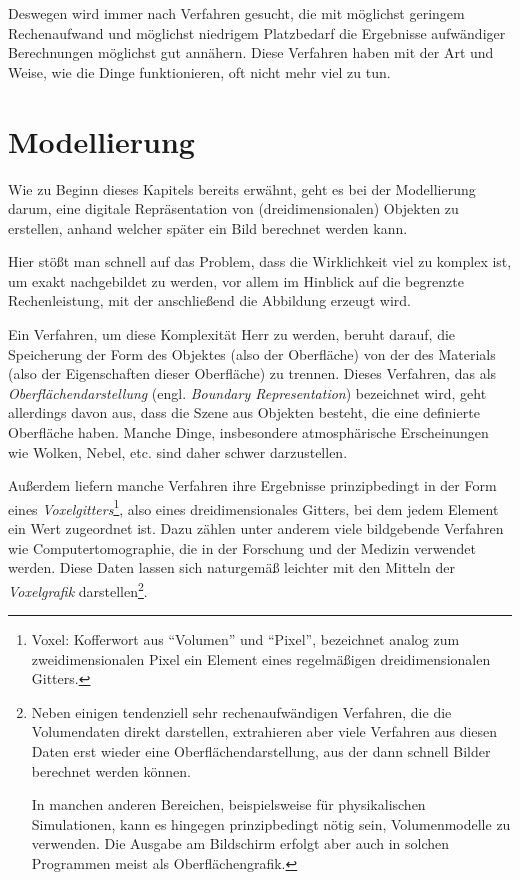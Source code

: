 Deswegen wird immer nach Verfahren gesucht, die mit möglichst geringem Rechenaufwand und möglichst niedrigem Platzbedarf die Ergebnisse aufwändiger Berechnungen möglichst gut annähern. Diese Verfahren haben mit der Art und Weise, wie die Dinge funktionieren, oft nicht mehr viel zu tun.

\section{Modellierung}
Wie zu Beginn dieses Kapitels bereits erwähnt, geht es bei der Modellierung darum, eine digitale Repräsentation von (dreidimensionalen) Objekten zu erstellen, anhand welcher später ein Bild berechnet werden kann.

Hier stößt man schnell auf das Problem, dass die Wirklichkeit viel zu komplex ist, um exakt nachgebildet zu werden, vor allem im Hinblick auf die begrenzte Rechenleistung, mit der anschließend die Abbildung erzeugt wird.

Ein Verfahren, um diese Komplexität Herr zu werden, beruht darauf, die Speicherung der Form des Objektes (also der Oberfläche) von der des Materials (also der Eigenschaften dieser Oberfläche) zu trennen. Dieses Verfahren, das als \emph{Oberflächendarstellung} (engl. \emph{Boundary Representation}) bezeichnet wird, geht allerdings davon aus, dass die Szene aus Objekten besteht, die eine definierte Oberfläche haben. Manche Dinge, insbesondere atmosphärische Erscheinungen wie Wolken, Nebel, etc. sind daher schwer darzustellen.

Außerdem liefern manche Verfahren ihre Ergebnisse prinzipbedingt in der Form eines \emph{Voxelgitters}\footnote{Voxel: Kofferwort aus \enquote{Volumen} und \enquote{Pixel}, bezeichnet analog zum zweidimensionalen Pixel ein Element eines regelmäßigen dreidimensionalen Gitters.}, also eines dreidimensionales Gitters, bei dem jedem Element ein Wert zugeordnet ist. Dazu zählen unter anderem viele bildgebende Verfahren wie Computertomographie, die in der Forschung und der Medizin verwendet werden. Diese Daten lassen sich naturgemäß leichter mit den Mitteln der \emph{Voxelgrafik} darstellen\footnote{Neben einigen tendenziell sehr rechenaufwändigen Verfahren, die die Volumendaten direkt darstellen, extrahieren aber viele Verfahren aus diesen Daten erst wieder eine Oberflächendarstellung, aus der dann schnell Bilder berechnet werden können.

In manchen anderen Bereichen, beispielsweise für physikalischen Simulationen, kann es hingegen prinzipbedingt nötig sein, Volumenmodelle zu verwenden. Die Ausgabe am Bildschirm erfolgt aber auch in solchen Programmen meist als Oberflächengrafik.}.

